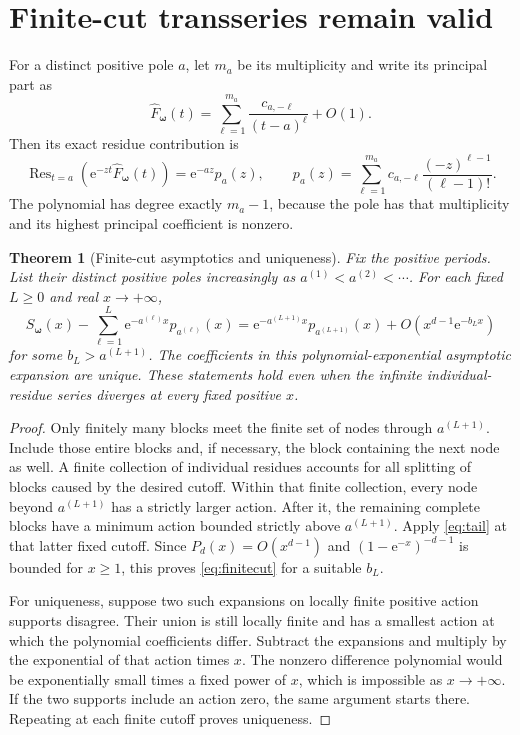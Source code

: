 \documentclass[11pt,a4paper]{article}
\numberwithin{equation}{section}
\newtheorem{theorem}{Theorem}[section]
\theoremstyle{definition}
\theoremstyle{remark}
\newcommand{\e}{\mathrm e}
\newcommand{\Res}{\operatorname{Res}}
\newcommand{\bw}{\boldsymbol\omega}
\begin{document}
\section{Finite-cut transseries remain valid}
\label{sec:finitecut}
For a distinct positive pole $a$, let $m_a$ be its multiplicity and write
its principal part as
\begin{equation}
 \widehat F_{\bw}(t)=\sum_{\ell=1}^{m_a}
            \frac{c_{a,-\ell}}{(t-a)^\ell}+O(1).
 \label{eq:principal}
\end{equation}
Then its exact residue contribution is
\begin{equation}
 \Res_{t=a}(\e^{-zt}\widehat F_{\bw}(t))
 =\e^{-az}p_a(z),\qquad
 p_a(z)=\sum_{\ell=1}^{m_a}
        c_{a,-\ell}\frac{(-z)^{\ell-1}}{(\ell-1)!}.
 \label{eq:pa}
\end{equation}
The polynomial has degree exactly $m_a-1$, because the pole has that
multiplicity and its highest principal coefficient is nonzero.

\begin{theorem}[Finite-cut asymptotics and uniqueness]
\label{thm:finitecut}
Fix the positive periods. List their distinct positive poles increasingly
as $a^{(1)}<a^{(2)}<\cdots$. For each fixed $L\ge0$ and real
$x\to+\infty$,
\begin{equation}
 S_{\bw}(x)-\sum_{\ell=1}^{L}
       \e^{-a^{(\ell)}x}p_{a^{(\ell)}}(x)
 =\e^{-a^{(L+1)}x}p_{a^{(L+1)}}(x)
  +O\!\left(x^{d-1}\e^{-b_Lx}\right)
 \label{eq:finitecut}
\end{equation}
for some $b_L>a^{(L+1)}$. The coefficients in this polynomial-exponential
asymptotic expansion are unique. These statements hold even when the
infinite individual-residue series diverges at every fixed positive $x$.
\end{theorem}
\begin{proof}
Only finitely many blocks meet the finite set of nodes through
$a^{(L+1)}$. Include those entire blocks and, if necessary, the block
containing the next node as well. A finite collection of individual
residues accounts for all splitting of blocks caused by the desired
cutoff. Within that finite collection, every node beyond
$a^{(L+1)}$ has a strictly larger action. After it, the remaining
complete blocks have a minimum action bounded strictly above
$a^{(L+1)}$. Apply \eqref{eq:tail} at that latter fixed cutoff. Since
$P_d(x)=O(x^{d-1})$ and $(1-\e^{-x})^{-d-1}$ is bounded for $x\ge1$,
this proves \eqref{eq:finitecut} for a suitable $b_L$.

For uniqueness, suppose two such expansions on locally finite positive
action supports disagree. Their union is still locally finite and has a
smallest action at which the polynomial coefficients differ. Subtract
the expansions and multiply by the exponential of that action times $x$.
The nonzero difference polynomial would be exponentially small times a
fixed power of $x$, which is impossible as $x\to+\infty$. If the two
supports include an action zero, the same argument starts there. Repeating
at each finite cutoff proves uniqueness.
\end{proof}
\end{document}

